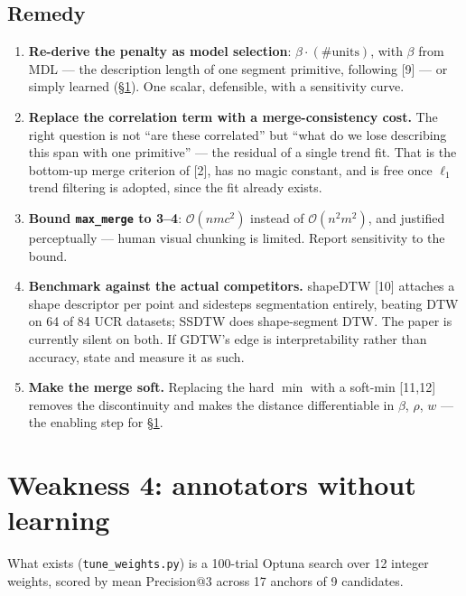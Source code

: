 \documentclass[11pt]{article}
\newcommand{\code}[1]{\texttt{\small #1}}
\begin{document}
\subsection{Remedy}
\begin{enumerate}[leftmargin=*]
  \item \textbf{Re-derive the penalty as model selection}: $\beta\cdot(\#\text{units})$, with
  $\beta$ from MDL --- the description length of one segment primitive, following [9] --- or
  simply learned (\S\ref{sec:learning}). One scalar, defensible, with a sensitivity curve.
  \item \textbf{Replace the correlation term with a merge-consistency cost.} The right
  question is not ``are these correlated'' but ``what do we lose describing this span with
  one primitive'' --- the residual of a single trend fit. That is the bottom-up merge
  criterion of [2], has no magic constant, and is free once $\ell_1$ trend filtering is
  adopted, since the fit already exists.
  \item \textbf{Bound \code{max\_merge} to 3--4}: $\mathcal{O}(nm c^2)$ instead of
  $\mathcal{O}(n^2m^2)$, and justified perceptually --- human visual chunking is limited.
  Report sensitivity to the bound.
  \item \textbf{Benchmark against the actual competitors.} shapeDTW [10] attaches a shape
  descriptor per point and sidesteps segmentation entirely, beating DTW on 64 of 84 UCR
  datasets; SSDTW does shape-segment DTW. The paper is currently silent on both. If GDTW's
  edge is interpretability rather than accuracy, state and measure it as such.
  \item \textbf{Make the merge soft.} Replacing the hard $\min$ with a soft-min [11,12]
  removes the discontinuity and makes the distance differentiable in $\beta$, $\rho$, $w$ ---
  the enabling step for \S\ref{sec:learning}.
\end{enumerate}

\section{Weakness 4: annotators without learning}
\label{sec:learning}
What exists (\code{tune\_weights.py}) is a 100-trial Optuna search over 12 integer weights,
scored by mean Precision@3 across 17 anchors of 9 candidates.
\end{document}
